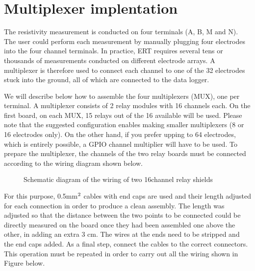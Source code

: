 \documentclass[letterpaper,10pt,english]{sphinxmanual}
\let\sphinxpxdimen\pdfpxdimen\else\newdimen\sphinxpxdimen
\begin{document}
\section{Multiplexer implentation}
\label{\detokenize{V1_02:multiplexer-implentation}}
\sphinxAtStartPar
The resistivity measurement is conducted on four terminals (A, B, M and N). The user could perform each measurement
by manually plugging four electrodes into the four channel terminals. In practice, ERT requires several tens or thousands
of measurements conducted on different electrode arrays. A multiplexer is therefore used to connect each channel to one of
the 32 electrodes stuck into the ground, all of which are connected to the data logger.

\sphinxAtStartPar
We will describe below how to assemble the four multiplexers (MUX), one per terminal. A multiplexer consists of 2 relay
modules with 16 channels each. On the first board, on each MUX, 15 relays out of the 16 available will be used. Please note that the suggested
configuration enables making smaller multiplexers (8 or 16 electrodes only). On the other hand, if you prefer upping to 64 electrodes,
which is entirely possible, a GPIO channel multiplier will have to be used.
To prepare the multiplexer, the channels of the two relay boards must be connected according to the wiring diagram shown below.

\begin{figure}[htbp]
\centering
\capstart

\noindent\sphinxincludegraphics[width=800\sphinxpxdimen,height=500\sphinxpxdimen]{{multiplexer_implementation}.jpg}
\caption{Schematic diagram of the wiring of two 16\sphinxhyphen{}channel relay shields}\label{\detokenize{V1_02:id6}}\end{figure}

\sphinxAtStartPar
For this purpose, 0.5\sphinxhyphen{}mm\(\sp{\text{2}}\) cables with end caps are used and their length adjusted for each connection in order to produce a clean assembly.
The length was adjusted so that the distance between the two points to be connected could be directly measured on the board once they had
been assembled one above the other, in adding an extra 3 cm. The wires at the ends need to be stripped and the end caps added.
As a final step, connect the cables to the correct connectors. This operation must be repeated in order to carry out all the wiring shown in Figure below.
\end{document}
